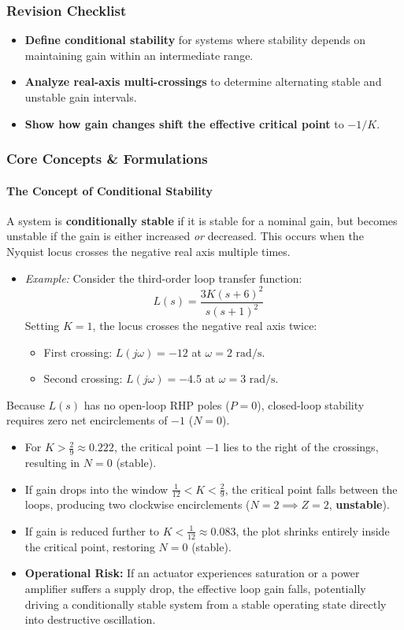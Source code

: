 \documentclass[12pt,onecolumn,twoside ]{article}
\begin{document}
	\subsubsection{Revision Checklist}
	\begin{itemize}
		\item[$\square$]
		\textbf{Define conditional stability} for systems where stability depends on maintaining gain within an intermediate range.
		\item[$\square$]
		\textbf{Analyze real-axis multi-crossings} to determine alternating stable and unstable gain intervals.
		\item[$\square$]
		\textbf{Show how gain changes shift the effective critical point} to $-1/K$.
	\end{itemize}
	
	\subsubsection{Core Concepts \& Formulations}
	\paragraph{The Concept of Conditional Stability}
	A system is \textbf{conditionally stable} if it is stable for a nominal gain, but becomes unstable if the gain is either increased \textit{or} decreased. This occurs when the Nyquist locus crosses the negative real axis multiple times.
	\begin{itemize}
		\item
		\textit{Example:} Consider the third-order loop transfer function: \[
		L(s) = \frac{3K(s + 6)^2}{s(s + 1)^2} \quad
		\] Setting $K = 1$, the locus crosses the negative real axis twice:
		\begin{itemize}
			\item
			First crossing: $L(j\omega) = -12$ at $\omega = 2\text{ rad/s}$.
			\item
			Second crossing: $L(j\omega) = -4.5$ at $\omega = 3\text{ rad/s}$.
		\end{itemize}
	\end{itemize}
	Because $L(s)$ has no open-loop RHP poles ($P = 0$), closed-loop stability requires zero net encirclements of $-1$ ($N = 0$).
	\begin{itemize}
		\item
		For $K > \frac{2}{9} \approx 0.222$, the critical point $-1$ lies to the right of the crossings, resulting in $N = 0$ (stable).
		\item
		If gain drops into the window $\frac{1}{12} < K < \frac{2}{9}$, the critical point falls between the loops, producing two clockwise encirclements ($N = 2 \implies Z = 2$, \textbf{unstable}).
		\item
		If gain is reduced further to $K < \frac{1}{12} \approx 0.083$, the plot shrinks entirely inside the critical point, restoring $N = 0$ (stable).
		\item
		\textbf{Operational Risk:} If an actuator experiences saturation or a power amplifier suffers a supply drop, the effective loop gain falls, potentially driving a conditionally stable system from a stable operating state directly into destructive oscillation.
	\end{itemize}
	
\end{document}
